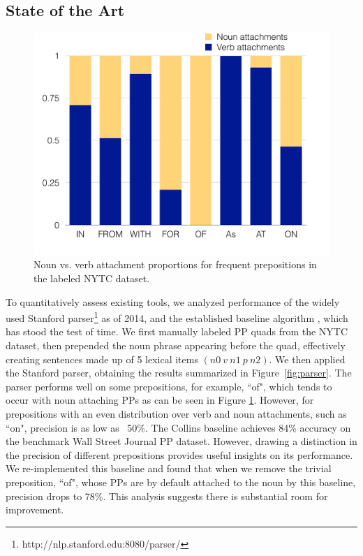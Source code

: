 
\subsection{State  of  the Art}
    

\begin{figure}[t]
 \centering
 \includegraphics[width=0.85\columnwidth] {mainresults-5.pdf}
 \vspace*{-0.5cm}
 \caption{Noun vs. verb attachment proportions for frequent prepositions in the labeled NYTC dataset.}
 \label{fig:distribution}
 \end{figure}  

 To quantitatively assess existing tools, we analyzed performance of the widely used  Stanford parser\footnote {http://nlp.stanford.edu:8080/parser/} as of 2014,  and the established  baseline algorithm \cite{Collins95}, which has stood the test of time.
We first manually labeled PP quads from the NYTC dataset, then prepended the noun phrase appearing before the quad, effectively creating sentences made up of 5 lexical items 
$(n0\  v\  n1\  p\  n2)$.  We then applied the Stanford parser, obtaining the results summarized in Figure~\ref{fig:parser}.  The parser performs well on some prepositions, for example,  ``of", which tends to occur with noun attaching PPs as can be seen in Figure \ref{fig:distribution}.  However, for  prepositions  with an even distribution over verb and noun attachments, such as ``on", precision is as low as ~50\%. %
The Collins baseline achieves 84\% accuracy on the benchmark Wall Street Journal PP dataset.  
 However, drawing a distinction in the precision of  different prepositions provides useful insights on its performance.  We re-implemented this baseline  and found that when we remove the trivial preposition,  ``of",  whose PPs are by default attached to the noun by this baseline, precision drops to 78\%. 
 This  analysis  suggests there is substantial room for improvement.


